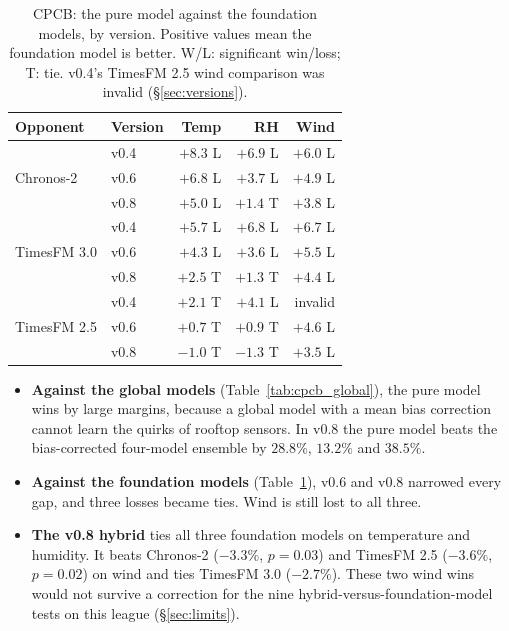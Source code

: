 \begin{table}[t]
\caption{CPCB: the pure model against the foundation models, by version. Positive values mean the foundation model is
better. W/L: significant win/loss; T: tie. v0.4's TimesFM 2.5 wind comparison was invalid (\S\ref{sec:versions}).}
\label{tab:cpcb_fm}
\small
\setlength{\tabcolsep}{3.5pt}
\begin{tabular}{@{}llrrr@{}}
\toprule
Opponent & Version & Temp & RH & Wind \\
\midrule
\multirow{3}{*}{Chronos-2} & v0.4 & $+8.3$ L & $+6.9$ L & $+6.0$ L \\
 & v0.6 & $+6.8$ L & $+3.7$ L & $+4.9$ L \\
 & v0.8 & $+5.0$ L & $+1.4$ T & $+3.8$ L \\
\midrule
\multirow{3}{*}{TimesFM 3.0} & v0.4 & $+5.7$ L & $+6.8$ L & $+6.7$ L \\
 & v0.6 & $+4.3$ L & $+3.6$ L & $+5.5$ L \\
 & v0.8 & $+2.5$ T & $+1.3$ T & $+4.4$ L \\
\midrule
\multirow{3}{*}{TimesFM 2.5} & v0.4 & $+2.1$ T & $+4.1$ L & invalid \\
 & v0.6 & $+0.7$ T & $+0.9$ T & $+4.6$ L \\
 & v0.8 & $-1.0$ T & $-1.3$ T & $+3.5$ L \\
\bottomrule
\end{tabular}
\end{table}

\begin{itemize}
\item \textbf{Against the global models} (Table~\ref{tab:cpcb_global}), the pure model wins by large margins, because
a global model with a mean bias correction cannot learn the quirks of rooftop sensors. In v0.8 the pure model beats
the bias-corrected four-model ensemble by $28.8\%$, $13.2\%$ and $38.5\%$.
\item \textbf{Against the foundation models} (Table~\ref{tab:cpcb_fm}), v0.6 and v0.8 narrowed every gap, and three
losses became ties. Wind is still lost to all three.
\item \textbf{The v0.8 hybrid} ties all three foundation models on temperature and humidity. It beats Chronos-2
($-3.3\%$, $p=0.03$) and TimesFM 2.5 ($-3.6\%$, $p=0.02$) on wind and ties TimesFM 3.0 ($-2.7\%$). These two wind
wins would not survive a correction for the nine hybrid-versus-foundation-model tests on this league
(\S\ref{sec:limits}).
\end{itemize}

